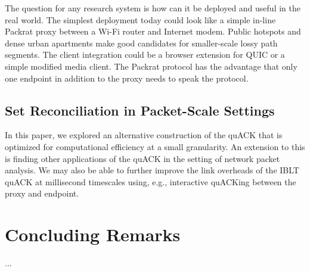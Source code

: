 The question for any research system is how can it be deployed and useful in
the real world. The simplest deployment today could look like a simple in-line
Packrat proxy between a Wi-Fi router and Internet modem. Public hotspots and
dense urban apartments make good candidates for smaller-scale lossy path
segments.
The client integration could be a browser extension for QUIC or a simple
modified media client.
The Packrat protocol has the advantage that only one endpoint in addition to the
proxy needs to speak the protocol.

\subsection{Set Reconciliation in Packet-Scale Settings}

In this paper, we explored an alternative construction of the quACK that is
optimized for computational efficiency at a small granularity. An extension to
this is finding other applications of the quACK in the setting of network
packet analysis. We may also be able to further improve the link overheads of
the IBLT quACK at millisecond timescales using, e.g., interactive quACKing
between the proxy and endpoint.



\section{Concluding Remarks}
...